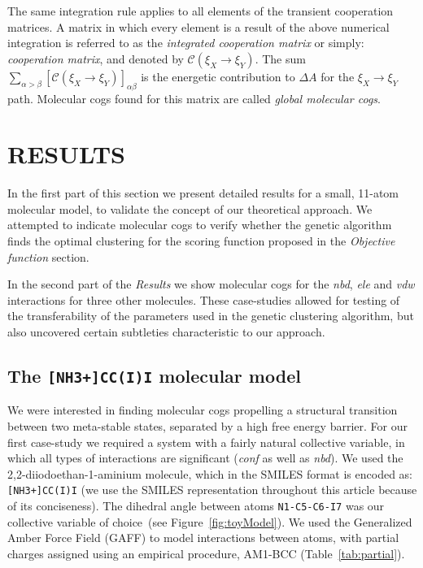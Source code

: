 The same integration rule applies to all elements of the transient cooperation matrices.
A matrix in which every element is a result of the above numerical integration is referred to as the \emph{integrated cooperation matrix} or simply: \emph{cooperation matrix}, and denoted by $\mathcal{C}(\xi_X\to\xi_Y)$.
The sum \mbox{$\sum_{\alpha>\beta}[\mathcal{C}(\xi_X\to\xi_Y)]_{\alpha\beta}$} is the energetic contribution to $\Delta A$ for the $\xi_X\to\xi_Y$ path.
Molecular cogs found for this matrix are called \emph{global molecular cogs}.


\section*{\sffamily \Large RESULTS}

{\color{black}In the first part of this section} we present {\color{black}detailed} results for a small, 11-atom molecular model, to validate the concept of our theoretical approach.
We attempted to indicate molecular cogs to verify whether the genetic algorithm finds the optimal clustering for the scoring function proposed in the \emph{Objective function} section.

{\color{black}
In the second part of the \emph{Results} we show molecular cogs for the \emph{nbd}, \emph{ele} and \emph{vdw} interactions for three other molecules.
These case-studies allowed for testing of the transferability of the parameters used in the genetic clustering algorithm, but also uncovered certain subtleties characteristic to our approach.
}

\subsection*{The \texttt{[NH3+]CC(I)I} molecular model}\label{sec:toy}
We were interested in finding molecular cogs propelling {\color{black}a structural} transition between two meta-stable states, separated by a high free energy barrier.
{\color{black}For our first case-study we required} a system with a fairly natural collective variable, in which all types of interactions are significant (\emph{conf} as well as \emph{nbd}).
We used the {\color{black}2,2-diiodoethan-1-aminium} molecule, {\color{black}which in the SMILES format is encoded as:} \texttt{[NH3+]CC(I)I} {\color{black}(we use the SMILES representation throughout this article because of its conciseness)}.
The dihedral angle between atoms \texttt{N1-C5-C6-I7} {\color{black}was} our collective variable of choice~(see Figure~\ref{fig:toyModel}).
We used the Generalized Amber Force Field (GAFF) to model interactions between atoms, with partial charges assigned using an empirical procedure, AM1-BCC (Table~\ref{tab:partial}).


